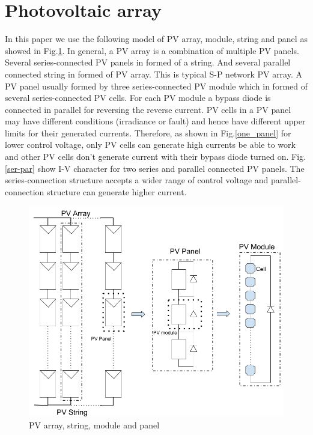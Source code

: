 \documentclass[conference]{IEEEtran}
\begin{document}
\section{Photovoltaic array}\label{Sec2}
In this paper we use the following model of PV array, module, string and panel as showed in Fig.\ref{model}. In general, a PV array is a combination of multiple PV panels. Several series-connected PV panels in formed of a string. And several parallel connected string in formed of PV array. This is typical S-P network PV array. A PV panel usually formed by three series-connected PV module which in formed of several series-connected PV cells. For each PV module a bypass diode is connected in parallel for reversing the reverse current. PV cells in a PV panel may have different conditions (irradiance or fault) and hence have different  upper limits for their generated currents. Therefore, as shown in Fig.\ref{one_panel} for lower control voltage, only PV cells can generate high currents be able to work and other PV cells don't generate current with their bypass diode turned on. Fig.\ref{ser-par} show I-V character for two series and parallel connected PV panels. The series-connection structure accepts a wider range of control voltage and parallel-connection structure can generate higher current.
\begin{figure}
    \centering
    \includegraphics[width=0.8\linewidth]{module.png}
    \caption{PV array, string, module and panel}
    \label{model}
\end{figure}
\end{document}
